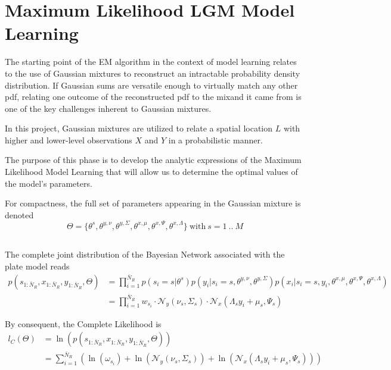 \section{Maximum Likelihood LGM Model Learning}

The starting point of the EM algorithm in the context of model learning relates to the use of Gaussian mixtures to reconstruct an intractable probability density distribution. If Gaussian sums are versatile enough to virtually match any other pdf, relating one outcome of the reconstructed pdf to the mixand it came from is one of the key challenges inherent to Gaussian mixtures. 

In this project, Gaussian mixtures are utilized to relate a spatial location $L$ with higher and lower-level observations $X$ and $Y$ in a probabilistic manner.

The purpose of this phase is to develop the analytic expressions of the Maximum Likelihood Model Learning that will allow us to determine the optimal values of the model's parameters.

For compactness, the full set of parameters appearing in the Gaussian mixture is denoted
\begin{equation}
\Theta =\{\theta^s,\theta^{y,\nu}, \theta^{y,\Sigma}, \theta^{x,\mu}, \theta^{x,\Psi}, \theta^{x,\Lambda}\}\ \mathrm{with}\ s = 1\ ..\ M
\end{equation}
\subsection{}
The complete joint  distribution of the Bayesian Network associated with the plate model reads
\begin{align}
p(s_{1:\bar{N}_R},x_{1:\bar{N}_R},y_{1:\bar{N}_R},\Theta) &= \prod\limits_{i = 1}^{\bar{N}_R}p(s_i = s\vert\theta^s)
p(y_i\vert s_i = s, \theta^{y,\nu}, \theta^{y,\Sigma})p(x_i\vert s_i = s,y_i, \theta^{x,\mu}, \theta^{x,\Psi}, \theta^{x,\Lambda})
\nonumber \\ &=  \prod\limits_{i = 1}^{\bar{N}_R}w_{s_i}\cdot
\mathcal{N}_y\left(\nu_s,\Sigma_s\right)\cdot\mathcal{N}_x\left(\Lambda_sy_i + \mu_s,\Psi_s\right)
\end{align}

By consequent, the Complete Likelihood is
\begin{align}
l_C(\Theta)& = \ln\left(p(s_{1:\bar{N}_R},x_{1:\bar{N}_R},y_{1:\bar{N}_R},\Theta)\right)\nonumber\\
&= \sum\limits_{i = 1}^{\bar{N}_R}\left(\ln(\omega_{s_i}) + \ln\left(\mathcal{N}_y\left(\nu_s,\Sigma_s\right)\right)+ \ln\left(\mathcal{N}_x\left(\Lambda_sy_i + \mu_s,\Psi_s\right)\right)\right) 
\end{align}

